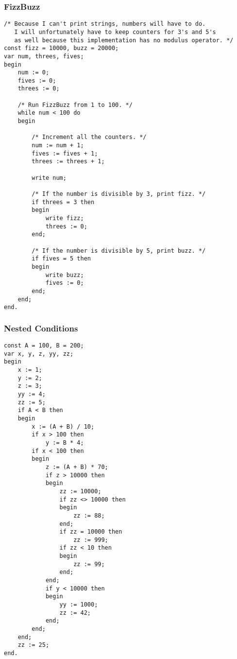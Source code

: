 \documentclass[12pt]{memoir}
\begin{document}
\pagebreak

\subsubsection*{FizzBuzz}
\begin{lstlisting}
/* Because I can't print strings, numbers will have to do.
   I will unfortunately have to keep counters for 3's and 5's
   as well because this implementation has no modulus operator. */
const fizz = 10000, buzz = 20000;
var num, threes, fives;
begin
    num := 0;
    fives := 0;
    threes := 0;
    
    /* Run FizzBuzz from 1 to 100. */
    while num < 100 do
    begin

        /* Increment all the counters. */
        num := num + 1;
        fives := fives + 1;
        threes := threes + 1;
    
        write num;

        /* If the number is divisible by 3, print fizz. */
        if threes = 3 then
        begin
            write fizz;
            threes := 0;
        end;

        /* If the number is divisible by 5, print buzz. */
        if fives = 5 then
        begin
            write buzz;
            fives := 0;
        end;
    end;
end.
\end{lstlisting}

\pagebreak

\subsubsection*{Nested Conditions}
\begin{lstlisting}
const A = 100, B = 200;
var x, y, z, yy, zz;
begin
    x := 1;
    y := 2;
    z := 3;
    yy := 4;
    zz := 5;
    if A < B then
    begin
        x := (A + B) / 10;
        if x > 100 then
            y := B * 4;
        if x < 100 then
        begin
            z := (A + B) * 70;
            if z > 10000 then
            begin
                zz := 10000;
                if zz <> 10000 then
                begin
                    zz := 88;
                end;
                if zz = 10000 then
                    zz := 999;
                if zz < 10 then
                begin
                    zz := 99;
                end;
            end;
            if y < 10000 then
            begin
                yy := 1000;
                zz := 42;
            end;
        end;
    end;
    zz := 25;
end.
\end{lstlisting}
\end{document}

